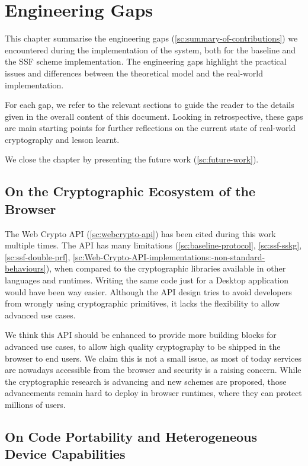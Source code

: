 \chapter{Engineering Gaps}\label{ch:gaps}

This chapter summarise the engineering gaps (\cref{sc:summary-of-contributions})
we encountered during the implementation of the system,
both for the baseline and the SSF scheme implementation.
The engineering gaps highlight the practical issues
and differences between the theoretical model and 
the real-world implementation.

For each gap, we refer to the relevant sections to guide the reader
to the details given in the overall content of this document.
Looking in retrospective, these gaps are main starting
points for further reflections on the current
state of real-world cryptography and lesson learnt.

We close the chapter by presenting the future work (\cref{sc:future-work}).

\section{On the Cryptographic Ecosystem of the Browser}\label{sc:gap-webcrypto-api}

The Web Crypto API (\cref{sc:webcrypto-api})
has been cited during this work
multiple times. 
The API has many limitations 
(\cref{sc:baseline-protocol}, \cref{sc:ssf-sskg}, \cref{sc:ssf-double-prf}, \cref{sc:Web-Crypto-API-implementations:-non-standard-behaviours}),
when compared to the cryptographic libraries available
in other languages and runtimes.
Writing the same code just for a Desktop application
would have been way easier.
Although the API design tries to avoid developers from
wrongly using cryptographic primitives, it lacks
the flexibility to allow advanced use cases.

We think this API should
be enhanced to provide more building blocks
for advanced use cases, to allow high quality
cryptography to be shipped in the browser to
end users. We claim this is not a small issue,
as most of today services are nowadays accessible
from the browser and security is a raising concern.
While the cryptographic research is advancing and new
schemes are proposed, those advancements remain hard to
deploy in browser runtimes, where they can 
protect millions of users.

\section{On Code Portability and Heterogeneous Device Capabilities}\label{sc:gap-code-portability}

